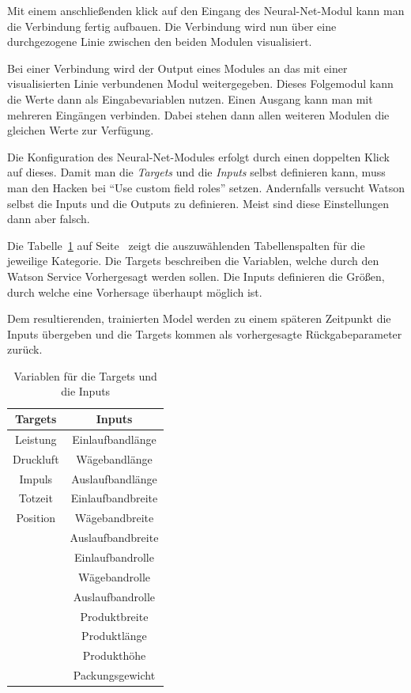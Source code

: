 Mit einem anschließenden klick auf den Eingang des Neural-Net-Modul kann man die Verbindung fertig aufbauen. Die Verbindung
wird nun über eine durchgezogene Linie zwischen den beiden Modulen visualisiert.

Bei einer Verbindung wird der Output eines Modules an das mit einer visualisierten Linie verbundenen Modul weitergegeben.
Dieses Folgemodul kann die Werte dann als Eingabevariablen nutzen. Einen Ausgang kann man mit mehreren Eingängen
verbinden. Dabei stehen dann allen weiteren Modulen die gleichen Werte zur Verfügung.

Die Konfiguration des Neural-Net-Modules erfolgt durch einen doppelten Klick auf dieses. Damit man die
\textit{Targets} und die \textit{Inputs} selbst definieren kann, muss man den Hacken bei \enquote{Use custom field roles}
setzen. Andernfalls versucht Watson selbst die Inputs und die Outputs zu definieren. Meist sind diese Einstellungen dann
aber falsch.

Die Tabelle~\ref{tab:targets_inputs} auf Seite~\pageref{tab:targets_inputs} zeigt die auszuwählenden Tabellenspalten für
die jeweilige Kategorie. Die Targets beschreiben die Variablen, welche durch den Watson Service Vorhergesagt werden
sollen. Die Inputs definieren die Größen, durch welche eine Vorhersage überhaupt möglich ist.

Dem resultierenden, trainierten Model werden zu einem späteren Zeitpunkt die Inputs übergeben und die Targets kommen als
vorhergesagte Rückgabeparameter zurück.

\begin{table}[h]
    \centering
    \begin{tabular}{|c|c|}
        \hline
        \textbf{Targets} & \textbf{Inputs}\\
        \hline
        \hline
        Leistung & Einlaufbandlänge\\
        \hline
        Druckluft & Wägebandlänge\\
        \hline
        Impuls & Auslaufbandlänge\\
        \hline
        Totzeit & Einlaufbandbreite\\
        \hline
        Position & Wägebandbreite\\
        \hline
        & Auslaufbandbreite\\
        \hline
        & Einlaufbandrolle\\
        \hline
        & Wägebandrolle\\
        \hline
        & Auslaufbandrolle\\
        \hline
        & Produktbreite\\
        \hline
        & Produktlänge\\
        \hline
        & Produkthöhe\\
        \hline
        & Packungsgewicht\\
        \hline
    \end{tabular}
    \caption{Variablen für die Targets und die Inputs}
    \label{tab:targets_inputs}
\end{table}

